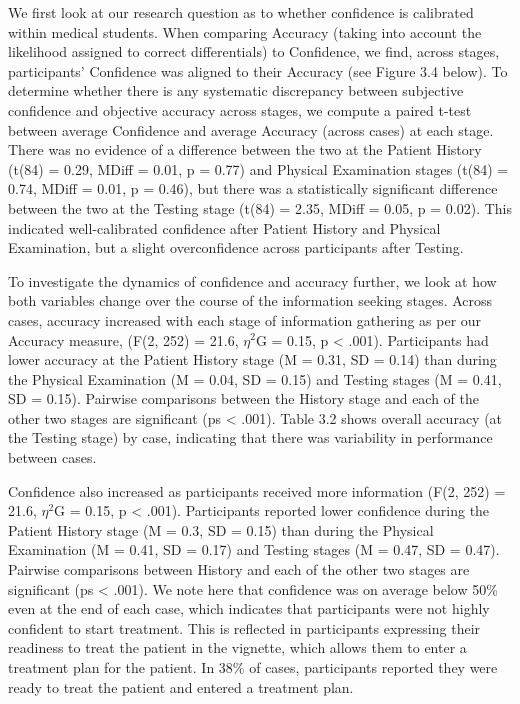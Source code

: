 \documentclass[a4paper, nobind]{templates/ociamthesis}
\begin{document}
We first look at our research question as to whether confidence is calibrated within medical students. When comparing Accuracy (taking into account the likelihood assigned to correct differentials) to Confidence, we find, across stages, participants' Confidence was aligned to their Accuracy (see Figure 3.4 below). To determine whether there is any systematic discrepancy between subjective confidence and objective accuracy across stages, we compute a paired t-test between average Confidence and average Accuracy (across cases) at each stage. There was no evidence of a difference between the two at the Patient History (t(84) = 0.29, MDiff = 0.01, p = 0.77) and Physical Examination stages (t(84) = 0.74, MDiff = 0.01, p = 0.46), but there was a statistically significant difference between the two at the Testing stage (t(84) = 2.35, MDiff = 0.05, p = 0.02). This indicated well-calibrated confidence after Patient History and Physical Examination, but a slight overconfidence across participants after Testing.

\hfill\break
To investigate the dynamics of confidence and accuracy further, we look at how both variables change over the course of the information seeking stages. Across cases, accuracy increased with each stage of information gathering as per our Accuracy measure, (F(2, 252) = 21.6, \(\eta^2\)G = 0.15, p \textless{} .001). Participants had lower accuracy at the Patient History stage (M = 0.31, SD = 0.14) than during the Physical Examination (M = 0.04, SD = 0.15) and Testing stages (M = 0.41, SD = 0.15). Pairwise comparisons between the History stage and each of the other two stages are significant (ps \textless{} .001). Table 3.2 shows overall accuracy (at the Testing stage) by case, indicating that there was variability in performance between cases.

\hfill\break
Confidence also increased as participants received more information (F(2, 252) = 21.6, \(\eta^2\)G = 0.15, p \textless{} .001). Participants reported lower confidence during the Patient History stage (M = 0.3, SD = 0.15) than during the Physical Examination (M = 0.41, SD = 0.17) and Testing stages (M = 0.47, SD = 0.47). Pairwise comparisons between History and each of the other two stages are significant (ps \textless{} .001). We note here that confidence was on average below 50\% even at the end of each case, which indicates that participants were not highly confident to start treatment. This is reflected in participants expressing their readiness to treat the patient in the vignette, which allows them to enter a treatment plan for the patient. In 38\% of cases, participants reported they were ready to treat the patient and entered a treatment plan.\\
\end{document}
